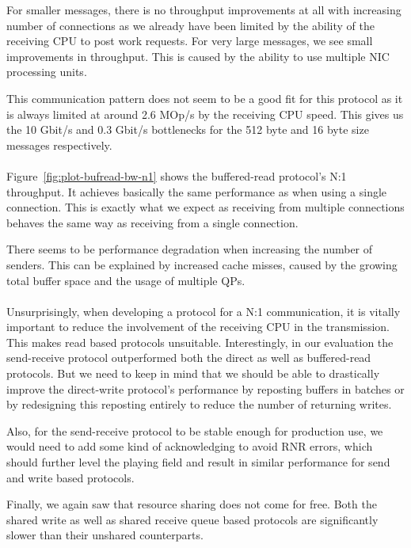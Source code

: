 For smaller messages, there is no throughput improvements at all with increasing number of connections as we already have 
been limited by the ability of the receiving CPU to post work requests. For very large messages, we see small improvements
in throughput. This is caused by the ability to use multiple NIC processing units.

This communication pattern does not seem to be a good fit for this protocol as it is always limited at around 
2.6 MOp/s by the receiving CPU speed. This gives us the 10 Gbit/s and 0.3 Gbit/s bottlenecks for the 512 byte and
16 byte size messages respectively.

\paragraph{} Figure~\ref{fig:plot-bufread-bw-n1} shows the buffered-read protocol's N:1 throughput. It 
achieves basically the 
same performance as when using a single connection. This is exactly what we expect as receiving from multiple connections
behaves the same way as receiving from a single connection.

There seems to be performance degradation when increasing the number of senders. This can  be explained
by increased cache misses, caused by the growing total buffer space and the usage of multiple QPs.


\paragraph{} Unsurprisingly, when developing a protocol for a N:1 communication, it is vitally important to reduce the 
involvement of the receiving CPU in the transmission. This makes read based protocols unsuitable. Interestingly, in our
evaluation the send-receive protocol outperformed both the direct as well as buffered-read protocols. But we need to 
keep in mind that we should be able to drastically improve the direct-write protocol's performance by reposting
buffers in batches or by redesigning this reposting entirely to reduce the number of returning writes.

Also, for the send-receive protocol to be stable enough for production use, we would need to add some kind of acknowledging to
avoid RNR errors, which should further level the playing field and result in similar performance for send and write based 
protocols.

Finally, we again saw that resource sharing does not come for free. Both the shared write as well as shared receive queue based
protocols are significantly slower than their unshared counterparts. 








